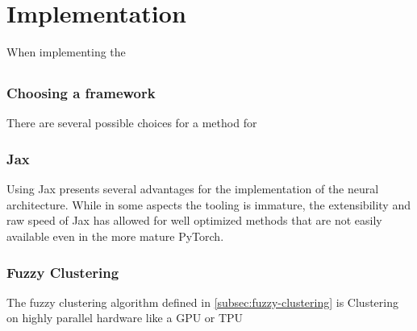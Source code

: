 \documentclass[../main.tex]{subfiles}
\begin{document}
    \chapter{Implementation}\label{ch:implementation}
    When implementing the



    \section{}\label{sec:technical-hurdles}

    \subsection{Choosing a framework}\label{subsec:choosing-a-framework}
    There are several possible choices for a method for

    \subsection{Jax}\label{subsec:jax}
    Using Jax presents several advantages for the implementation of the neural architecture.
    While in some aspects the tooling is immature, the extensibility and raw speed of Jax has allowed for well optimized methods that are not easily available even in the more mature PyTorch.

    \subsection{Fuzzy Clustering}\label{subsec:implementing-fuzzy-clustering}
    The fuzzy clustering algorithm defined in \autoref{subsec:fuzzy-clustering} is
    Clustering on highly parallel hardware like a GPU or TPU
\end{document}
